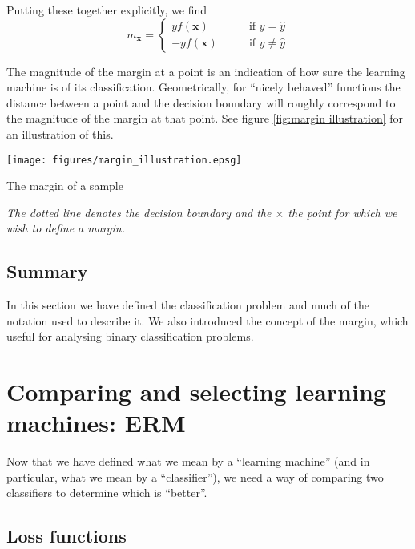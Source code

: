 Putting these together explicitly, we find
%
\begin{equation}
m_{\mathbf{x}} = \left\{ \begin{array}{rl}
yf(\mathbf{x})	& \qquad \mbox{if $y = \hat{y}$} \\
-yf(\mathbf{x})	& \qquad \mbox{if $y \neq \hat{y}$}
\end{array} \right.
\label{eqn:margin definition}
\end{equation}

The magnitude of the margin at a point is an indication of how sure the
learning machine is of its classification.  Geometrically, for
``nicely behaved'' functions the distance between a point and the
decision boundary will roughly correspond to the magnitude of the
margin at that point.  See figure \ref{fig:margin illustration} for an
illustration of this. 

\begin{linefigure}
\begin{center}
\texttt{[image: figures/margin\_illustration.epsg]}
\end{center}
\caption{The margin of a sample}
\emph{The dotted line denotes the decision boundary and the $\times$ the
point for which we wish to define a margin.}
\label{fig:margin illustration}
\end{linefigure}

\subsection{Summary}

In this section we have defined the classification problem and much of
the notation used to describe it.  We also introduced the concept of
the margin, which useful for analysing binary classification problems.



\section{Comparing and selecting learning machines: ERM}
\label{sec:erm}

Now that we have defined what we mean by a ``learning machine'' (and
in particular, what we mean by a ``classifier''), we need a way of
comparing two classifiers to determine which is ``better''.


\subsection{Loss functions}

